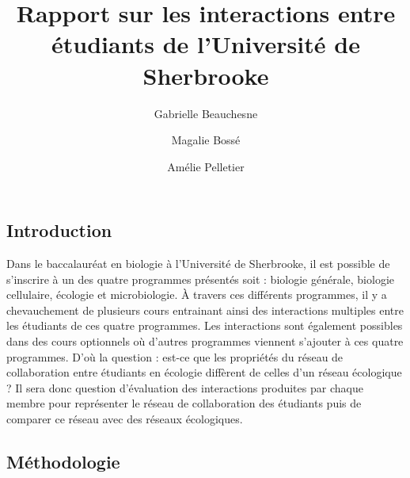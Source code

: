 \documentclass[9pt,twocolumn,twoside,]{pnas-new}
\title{Rapport sur les interactions entre étudiants de l'Université de
Sherbrooke}
\author[a,1,2]{Gabrielle Beauchesne}
\author[a,b]{Magalie Bossé}
\author[a,b,c]{Amélie Pelletier}
\affil[]{}
\begin{document}
\verticaladjustment{-2pt}



\maketitle
\thispagestyle{firststyle}


\acknow{}

\hypertarget{introduction}{%
\subsection*{Introduction}\label{introduction}}

Dans le baccalauréat en biologie à l'Université de Sherbrooke, il est
possible de s'inscrire à un des quatre programmes présentés soit :
biologie générale, biologie cellulaire, écologie et microbiologie. À
travers ces différents programmes, il y a chevauchement de plusieurs
cours entrainant ainsi des interactions multiples entre les étudiants de
ces quatre programmes. Les interactions sont également possibles dans
des cours optionnels où d'autres programmes viennent s'ajouter à ces
quatre programmes. D'où la question : est-ce que les propriétés du
réseau de collaboration entre étudiants en écologie diffèrent de celles
d'un réseau écologique ? Il sera donc question d'évaluation des
interactions produites par chaque membre pour représenter le réseau de
collaboration des étudiants puis de comparer ce réseau avec des réseaux
écologiques.

\hypertarget{Muxe9thodologie}{%
\subsection*{Méthodologie}\label{Muxe9thodologie}}
\end{document}
